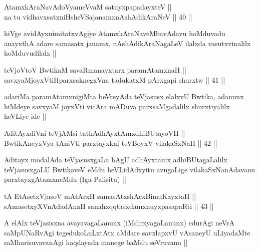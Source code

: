 \begin{shl}
AtamxkAraNavAdoV\s yameVvaM satuyxpapadayxteV || \\
na tu vidhavxsatxniHsheVSajanamxnAshAdikAraNeV ||  40 ||  
\end{shl}

\begin{artha}
hiVge avidAyxnimitatxvAgiye AtamxkAraNaveMbavAdavu hoMduvadu anayxthA
adare samasatx janamx, nAshAdikAraNagaLeV ilalxda vasutxvinalilx
hoMduvudilalx ||
\end{artha}


\begin{shl}
teVjoV\s toV BwtikaM savaRmanayxtarx paramAtamxnaH || \\
savxyaMjoyxVtiHparxsaknegxVna tadukatxM pArxgapi shurxtw ||  41 ||  
\end{shl}

\begin{artha}
adariMa paramAtamxnigiMta beVreyAda teVjasusx elalxvU Bwtika, adanunx
hiMdeye savxyaM joyxVti vicAra mADuva parxsaMgadalilx shurxtiyalilx
heVLiye ide ||
\end{artha}

\begin{shl}
AditAyxdiVni teVjAMsi tathA\s dhAyxtAmxdhiBUtayoVH || \\
BwtikAneyxVya tAniVti parxtayxknf teVBoyxV vilakaSxNaH ||  42 ||  
\end{shl}

\begin{artha}
Aditayx modalAda teVjasusxgaLu hAgU adhAyxtamx adhiBUtagaLalilx
teVjasusxgaLU BwtikaveV eMdu heVLidAdxyitu avugaLige
vilakaSxNanAdavanu parxtayxgAtamxneMdu (Iga Palisitu) ||
\end{artha}

\begin{shl}
tA EtAsetxVjasoV mAtArxH samasAtxshAcx\s \s BimuKayxtaH || \\
sAmasetxyXVnA\s \s dadAnaH sanahxqqtasxdamxnuyxpasapaRti ||  43 ||  
\end{shl}

\begin{artha}
A elAlx teVjasisxna avayavagaLanunx (iMdirxyagaLanunx) edurAgi neVrA
saMpUNaRvAgi tegedukoLuLxtAtx aMdare savxlapxvU vAsaneyU uLiyadaMte
saMharisuvavanAgi haqdayada manege baMdu seVruvanu ||
\end{artha}


